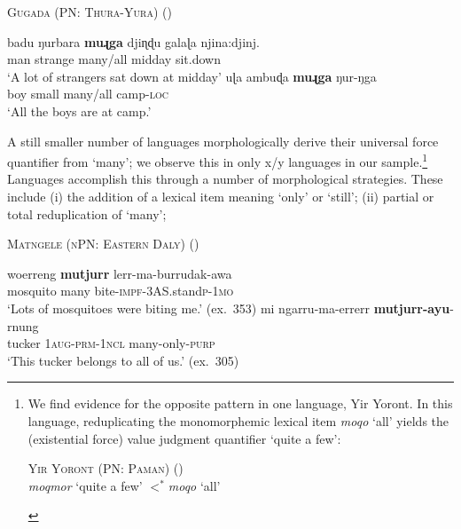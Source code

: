 \documentclass[12pt,egregdoesnotlikesansseriftitles]{scrartcl}
\begin{document}
\begin{exe}
  \ex  \textsc{Gugada (PN: Thura-Yura)} (\citealt[56,65]{platt72}) \label{manyallambig1}
  \begin{xlist}
    \ex \gll badu ŋurbara \textbf{muɻga} {djiɳɖu galaɭa} njina:djinj. \\ 
    man  strange  many/all  midday         sit.down\\
    \glt `A lot of strangers sat down at midday'
    \ex \gll uɭa ambuɖa \textbf{muɻga} ŋur-ŋga  \\
    boy   small    many/all      camp-\textsc{loc}\\
    \glt        `All the boys are at camp.'%
  \end{xlist}
 \end{exe}
 
 A still smaller number of languages morphologically derive their universal force quantifier from `many'; we observe this in only x/y languages in our sample.\footnote{We find evidence for the opposite pattern in one language, Yir Yoront. In this language, reduplicating the monomorphemic lexical item \textit{moqo} `all' yields the (existential force) value judgment quantifier `quite a few':

\begin{exe}
  \ex \textsc{Yir Yoront (PN: Paman)} (\citealt[375]{alpher73})\\
  \textit{\charis moqmor} `quite a few' $<^*$\textit{\charis moqo} `all'
\end{exe}}  Languages accomplish this  through a number of morphological strategies. These include (i) the addition of a lexical item meaning `only' or `still'; (ii) partial or total reduplication of `many'; 


\begin{exe}
  \ex  \textsc{Matngele (nPN: Eastern Daly)} (\citealt{zandvoort99})
  \begin{xlist}
    \ex \gll woerreng \textbf{mutjurr} lerr-ma-burrudak-awa\\
    mosquito many bite-\textsc{impf}-3AS.stand\textsc{p}-1\textsc{mo}\\
    \glt `Lots of mosquitoes were biting me.' (ex.~353) %
    \ex \gll mi ngarru-ma-errerr \textbf{mutjurr-ayu}-rnung\\
    tucker 1\textsc{aug-prm}-1\textsc{ncl} many-only-\textsc{purp}\\
    \glt `This tucker belongs to all of us.' (ex.~305)
    \end{xlist}
\end{exe}
\end{document}
